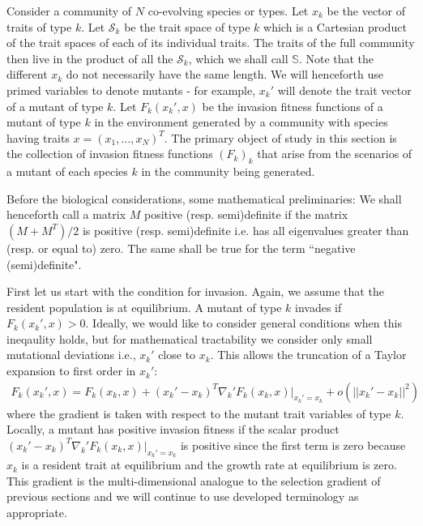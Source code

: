 Consider a community of $N$ co-evolving species or types. 
Let $x_k$ be the vector of traits of type $k$. 
Let $\mathcal{S}_k$ be the trait space of type $k$ which is a Cartesian product of the trait spaces of each of its individual traits.
The traits of the full community then live in the product of all the $\mathcal{S}_k$, which we shall call $\mathbb{S}$.
Note that the different $x_k$ do not necessarily have the same length. 
We will henceforth use primed variables to denote mutants - for example, $x_k'$ will denote the trait vector of a mutant of type $k$. 
Let $F_k(x_k',x)$ be the invasion fitness functions of a mutant of type $k$ in the environment generated by a community with species having traits $x = (x_1,...,x_N)^T$.
The primary object of study in this section is the collection of invasion fitness functions $(F_k)_k$ that arise from the scenarios of a mutant of each species $k$ in the community being generated. 

Before the biological considerations, some mathematical preliminaries: We shall henceforth call a matrix $M$ positive (resp. semi)definite if the matrix $(M+M^T)/2$ is positive (resp. semi)definite i.e. has all eigenvalues greater than (resp. or equal to) zero. 
The same shall be true for the term ``negative (semi)definite".


First let us start with the condition for invasion. 
Again, we assume that the resident population is at equilibrium.
A mutant of type $k$ invades if $F_k(x_k',x)>0$. 
Ideally, we would like to consider general conditions when this ineqaulity holds, but for mathematical tractability we consider only small mutational deviations i.e., $x_k'$ close to $x_k$.
This allows the truncation of a Taylor expansion to first order in $x_k'$:
\begin{align}
	F_k(x_k',x) = F_k(x_k,x) + (x_k'-x_k)^T \left. \nabla_k' F_k(x_k,x) \right|_{x_k'=x_k} + o(||x_k'-x_k||^2)
\end{align}
where the gradient is taken with respect to the mutant trait variables of type $k$. 
Locally, a mutant has positive invasion fitness if the scalar product $(x_k'-x_k)^T \left. \nabla_k' F_k(x_k,x) \right|_{x_k'=x_k}$ is positive since the first term is zero because $x_k$ is a resident trait at equilibrium and the growth rate at equilibrium is zero. 
This gradient is the multi-dimensional analogue to the selection gradient of previous sections and we will continue to use developed terminology as appropriate.

